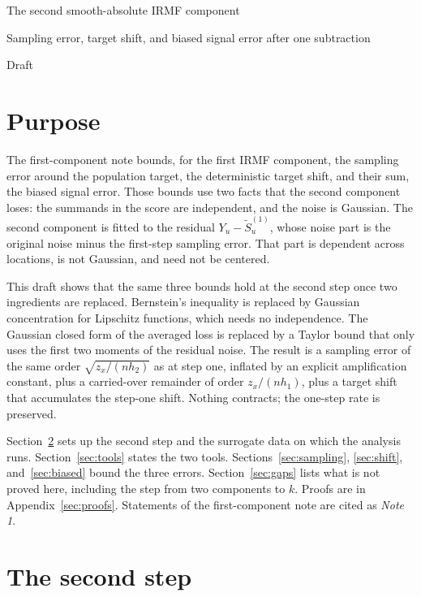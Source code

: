 \documentclass[11pt]{article}
\newcommand{\Data}{Y}
\newcommand{\IMFt}{\widetilde S}
\theoremstyle{definition}
\begin{document}
\begin{center}
  {\Large The second smooth-absolute IRMF component\par}
  \vspace{5pt}
  {\large Sampling error, target shift, and biased signal error after one
   subtraction\par}
  \vspace{5pt}
  {\normalsize Draft}
\end{center}

\section{Purpose}

The first-component note bounds, for the first IRMF component, the sampling
error around the population target, the deterministic target shift, and
their sum, the biased signal error.  Those bounds use two facts that the
second component loses: the summands in the score are independent, and the
noise is Gaussian.  The second component is fitted to the residual
\(\Data_u-\IMFt^{(1)}_u\), whose noise part is the original noise minus the
first-step sampling error.  That part is dependent across locations, is not
Gaussian, and need not be centered.

This draft shows that the same three bounds hold at the second step once two
ingredients are replaced.  Bernstein's inequality is replaced by Gaussian
concentration for Lipschitz functions, which needs no independence.  The
Gaussian closed form of the averaged loss is replaced by a Taylor bound that
only uses the first two moments of the residual noise.  The result is a
sampling error of the same order \(\sqrt{z_x/(nh_2)}\) as at step one,
inflated by an explicit amplification constant, plus a carried-over
remainder of order \(z_x/(nh_1)\), plus a target shift that accumulates the
step-one shift.  Nothing contracts; the one-step rate is preserved.

Section~\ref{sec:recursion} sets up the second step and the surrogate data
on which the analysis runs.  Section~\ref{sec:tools} states the two tools.
Sections~\ref{sec:sampling}, \ref{sec:shift}, and~\ref{sec:biased} bound
the three errors.  Section~\ref{sec:gaps} lists what is not proved here,
including the step from two components to \(k\).  Proofs are in
Appendix~\ref{sec:proofs}.  Statements of the first-component note are cited
as \emph{Note 1}.

\section{The second step}\label{sec:recursion}
\end{document}
